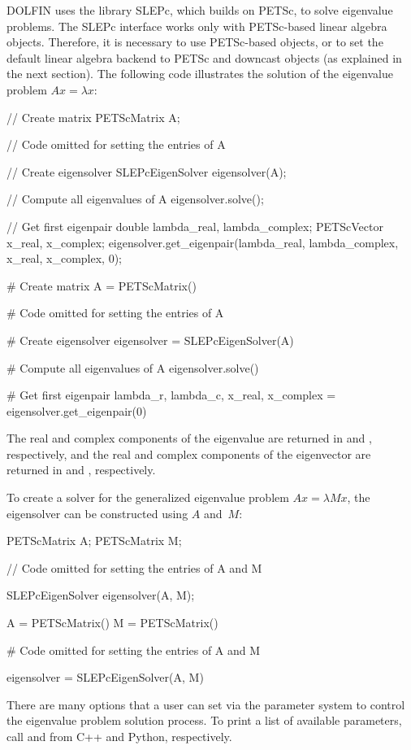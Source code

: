 DOLFIN uses the library SLEPc, which builds on PETSc, to solve eigenvalue
problems. The SLEPc interface works only with PETSc-based linear algebra
objects. Therefore, it is necessary to use PETSc-based objects, or to
set the default linear algebra backend to PETSc and downcast objects
(as explained in the next section). The following code illustrates
the solution of the eigenvalue problem $Ax = \lambda x$:
\begin{c++}
// Create matrix
PETScMatrix A;

// Code omitted for setting the entries of A

// Create eigensolver
SLEPcEigenSolver eigensolver(A);

// Compute all eigenvalues of A
eigensolver.solve();

// Get first eigenpair
double lambda_real, lambda_complex;
PETScVector x_real, x_complex;
eigensolver.get_eigenpair(lambda_real, lambda_complex, x_real, x_complex, 0);
\end{c++}
\begin{python}
# Create matrix
A = PETScMatrix()

# Code omitted for setting the entries of A

# Create eigensolver
eigensolver = SLEPcEigenSolver(A)

# Compute all eigenvalues of A
eigensolver.solve()

# Get first eigenpair
lambda_r, lambda_c, x_real, x_complex = eigensolver.get_eigenpair(0)
\end{python}
The real and complex components of the eigenvalue are returned in
 and , respectively, and the
real and complex components of the eigenvector are
returned in  and , respectively.

To create a solver for the generalized eigenvalue problem $Ax = \lambda Mx$, the
eigensolver can be constructed using $A$ and~$M$:

\begin{c++}
PETScMatrix A;
PETScMatrix M;

// Code omitted for setting the entries of A and M

SLEPcEigenSolver eigensolver(A, M);
\end{c++}
\begin{python}
A = PETScMatrix()
M = PETScMatrix()

# Code omitted for setting the entries of A and M

eigensolver = SLEPcEigenSolver(A, M)
\end{python}
There are many options that a user can set via the parameter system to
control the eigenvalue problem solution process. To print a list of
available parameters, call 
and  from C++ and Python,
respectively.

